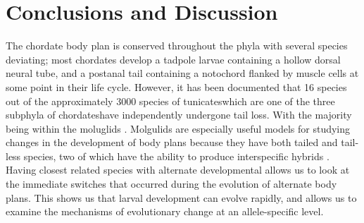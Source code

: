 \chapter{Conclusions and Discussion}
The chordate body plan is conserved throughout the phyla with several species deviating; most chordates develop a tadpole larvae containing a hollow dorsal neural tube, and a postanal tail containing a notochord flanked by muscle cells at some point in their life cycle. However, it has been documented that 16 species out of the approximately 3000 species of tunicates\textemdash which are one of the three subphyla of chordates\textemdash have independently undergone tail loss. With the majority being within the moluglids \cite{berrill_studies_1931,huber_evolution_2000}. %
Molgulids are especially useful models for studying changes in the development of body plans because they have both tailed and tail-less species, two of which have the ability to produce interspecific hybrids \cite{swalla_interspecific_1990}. Having closest related species with alternate developmental allows us to look at the immediate switches that occurred during the evolution of alternate body plans. This shows us that larval development can evolve rapidly, and allows us to examine the mechanisms of evolutionary change at an allele-specific level.

